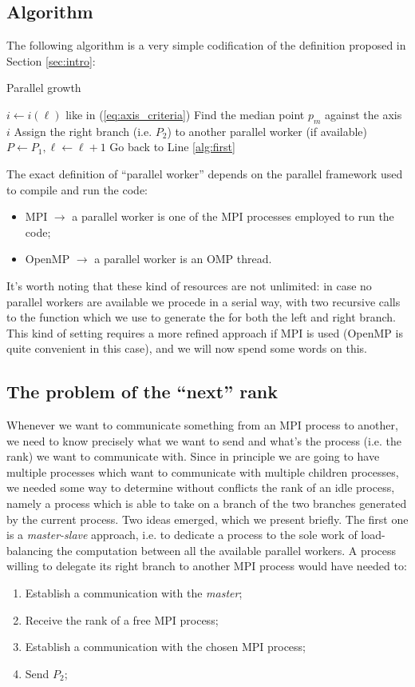 \documentclass{article}
\begin{document}
\subsection{Algorithm}
The following algorithm is a very simple codification of the definition proposed in
Section \ref{sec:intro}:
\begin{algorithm}
    \SetAlgoLined
    \caption{Parallel \kdtree{} growth}\label{alg:parallel_algorithm}
    $i \gets i(\ell)$ like in (\ref{eq:axis_criteria})\; \label{alg:first}
    Find the median point $p_m$ against the axis $i$\;
    Assign the right branch (i.e. $P_2$) to another parallel worker (if available)\;
    $P \gets P_1, \ell \gets \ell + 1$\;
    Go back to Line \ref{alg:first}\;
\end{algorithm}

The exact definition of ``parallel worker'' depends on the parallel framework
used to compile and run the code:
\begin{itemize}
    \item MPI $\to$ a parallel worker is one of the MPI processes employed to run the code;
    \item OpenMP $\to$ a parallel worker is an OMP thread.
\end{itemize}

It's worth noting that these kind of resources are not unlimited: in case no
parallel workers are available we procede in a serial way, with two recursive
calls to the function which we use to generate the \kdtree{} for both the left
and right branch. This kind of setting requires a more refined approach if
MPI is used (OpenMP is quite convenient in this case), and we will now spend
some words on this.

\subsection{The problem of the ``next'' rank} \label{sec:next_rank}
Whenever we want to communicate something from an MPI process to another, we
need to know precisely what we want to send and what's the process
(i.e. the rank) we want to communicate with. Since in principle we are going to
have multiple processes which want to communicate with multiple children
processes, we needed some way to determine without conflicts the rank of an
idle process, namely a process which is able to take on a branch of the two
branches generated by the current process. Two ideas emerged, which we present
briefly. The first one is a \emph{master-slave}  approach, i.e. to dedicate a
process to the sole work of load-balancing the computation between all the
available parallel workers. A process willing to delegate its right branch to
another MPI process would have needed to:
\begin{enumerate}
    \item Establish a communication with the \emph{master};
    \item Receive the rank of a free MPI process;
    \item Establish a communication with the chosen MPI process;
    \item Send $P_2$;
\end{enumerate}
\end{document}
